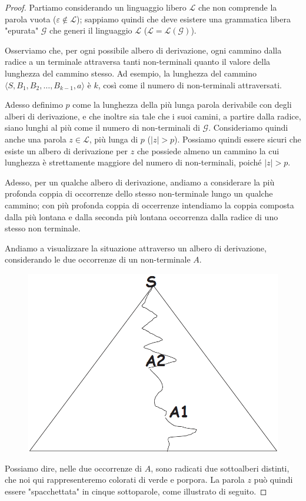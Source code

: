\documentclass[class=book, crop=false, oneside, 12pt]{standalone}
\begin{document}
\begin{proof}
  Partiamo considerando un linguaggio libero \(\mathcal{L}\) che non comprende la parola vuota (\(\varepsilon \notin \mathcal{L}\)); sappiamo quindi che deve esistere una grammatica libera "epurata" \(\mathcal{G}\) che generi il linguaggio \(\mathcal{L}\) (\(\mathcal{L} = \mathcal{L(G)}\)).

  Osserviamo che, per ogni possibile albero di derivazione, ogni cammino dalla radice a un terminale attraversa tanti non-terminali quanto il valore della lunghezza del cammino stesso. Ad esempio, la lunghezza del cammino \(\langle S, B_1, B_2, \ldots, B_{k-1}, a \rangle\) è \(k\), così come il numero di non-terminali attraversati.

  Adesso definimo \(p\) come la lunghezza della più lunga parola derivabile con degli alberi di derivazione, e che inoltre sia tale che i suoi camini, a partire dalla radice, siano lunghi al più come il numero di non-terminali di \(\mathcal{G}\). Consideriamo quindi anche una parola \(z \in \mathcal{L}\), più lunga di \(p\) (\(|z| > p\)). Possiamo quindi essere sicuri che esiste un albero di derivazione per \(z\) che possiede almeno un cammino la cui lunghezza è strettamente maggiore del numero di non-terminali, poiché \(|z| >p\).

  Adesso, per un qualche albero di derivazione, andiamo a considerare la più profonda coppia di occorrenze dello stesso non-terminale lungo un qualche cammino; con più profonda coppia di occerrenze intendiamo la coppia composta dalla più lontana e dalla seconda più lontana occorrenza dalla radice di uno stesso non terminale.

  Andiamo a visualizzare la situazione attraverso un albero di derivazione, considerando le due occorrenze di un non-terminale \(A\).

  \begin{figure}
    \centering
    \includegraphics[width=.25\textwidth,keepaspectratio]{pl-proof_1}
  \end{figure}

  Possiamo dire, nelle due occorrenze di \(A\), sono radicati due sottoalberi distinti, che noi qui rappresenteremo colorati di verde e porpora. La parola \(z\) può quindi essere "spacchettata" in cinque sottoparole, come illustrato di seguito.


\end{proof}
\end{document}
